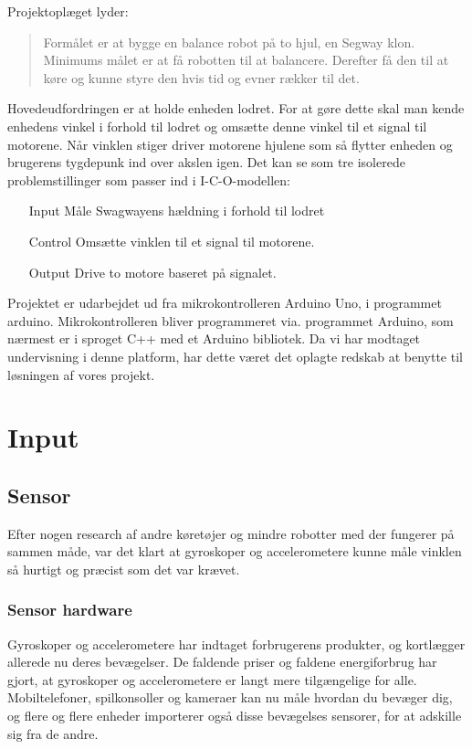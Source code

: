 \documentclass[a4paper,11pt,oneside,article,danish,table]{memoir}
\begin{document}
Projektoplæget lyder:
\begin{quote}
  Formålet er at bygge en balance robot på to hjul, en Segway klon. Minimums målet er at få robotten til at balancere. Derefter få den til at køre og kunne styre den hvis tid og evner rækker til det.
\end{quote}

Hovedeudfordringen er at holde enheden lodret. For at gøre dette skal man kende enhedens vinkel i forhold til lodret og omsætte denne vinkel til et signal til motorene. Når vinklen stiger driver motorene hjulene som så flytter enheden og brugerens tygdepunk ind over akslen igen.
Det kan se som tre isolerede problemstillinger som passer ind i I-C-O-modellen:
\begin{itemize}
\item[Input] Måle Swagwayens hældning i forhold til lodret
\item[Control] Omsætte vinklen til et signal til motorene.
\item[Output] Drive to motore baseret på signalet.
\end{itemize}

Projektet er udarbejdet ud fra mikrokontrolleren Arduino Uno, i programmet arduino. Mikrokontrolleren bliver programmeret via. programmet Arduino, som nærmest er i sproget C++ med et Arduino bibliotek. Da vi har modtaget undervisning i denne platform, har dette været det oplagte redskab at benytte til løsningen af vores projekt.

\chapter{Input}
\section{Sensor}
Efter nogen research af andre køretøjer og mindre robotter med der fungerer på sammen måde, var det klart at gyroskoper og accelerometere kunne måle vinklen så hurtigt og præcist som det var krævet.
\subsection{Sensor hardware}
Gyroskoper og accelerometere har indtaget forbrugerens produkter, og kortlægger allerede nu deres bevægelser. De faldende priser og faldene energiforbrug har gjort, at gyroskoper og accelerometere er langt mere tilgængelige for alle. Mobiltelefoner, spilkonsoller og kameraer kan nu måle hvordan du bevæger dig, og flere og flere enheder importerer også disse bevægelses sensorer, for at adskille sig fra de andre.
\end{document}
